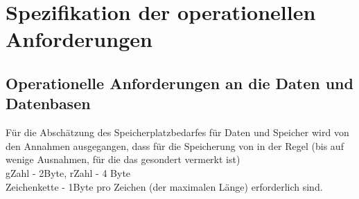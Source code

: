\chapter{Spezifikation der operationellen Anforderungen}
\section{Operationelle Anforderungen an die Daten und Datenbasen}
Für die Abschätzung des Speicherplatzbedarfes für Daten und Speicher wird von den Annahmen ausgegangen,
dass für die Speicherung von in der Regel (bis auf wenige Ausnahmen, für die das gesondert vermerkt ist)\\
         gZahl - 2Byte, rZahl - 4 Byte\\
         Zeichenkette - 1Byte pro Zeichen (der maximalen Länge) erforderlich sind.

